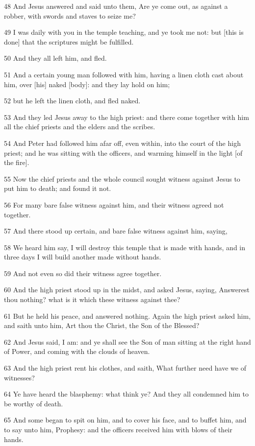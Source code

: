 \par 48 And Jesus answered and said unto them, Are ye come out, as against a robber, with swords and staves to seize me?
\par 49 I was daily with you in the temple teaching, and ye took me not: but [this is done] that the scriptures might be fulfilled.
\par 50 And they all left him, and fled.
\par 51 And a certain young man followed with him, having a linen cloth cast about him, over [his] naked [body]: and they lay hold on him;
\par 52 but he left the linen cloth, and fled naked.
\par 53 And they led Jesus away to the high priest: and there come together with him all the chief priests and the elders and the scribes.
\par 54 And Peter had followed him afar off, even within, into the court of the high priest; and he was sitting with the officers, and warming himself in the light [of the fire].
\par 55 Now the chief priests and the whole council sought witness against Jesus to put him to death; and found it not.
\par 56 For many bare false witness against him, and their witness agreed not together.
\par 57 And there stood up certain, and bare false witness against him, saying,
\par 58 We heard him say, I will destroy this temple that is made with hands, and in three days I will build another made without hands.
\par 59 And not even so did their witness agree together.
\par 60 And the high priest stood up in the midst, and asked Jesus, saying, Answerest thou nothing? what is it which these witness against thee?
\par 61 But he held his peace, and answered nothing. Again the high priest asked him, and saith unto him, Art thou the Christ, the Son of the Blessed?
\par 62 And Jesus said, I am: and ye shall see the Son of man sitting at the right hand of Power, and coming with the clouds of heaven.
\par 63 And the high priest rent his clothes, and saith, What further need have we of witnesses?
\par 64 Ye have heard the blasphemy: what think ye? And they all condemned him to be worthy of death.
\par 65 And some began to spit on him, and to cover his face, and to buffet him, and to say unto him, Prophesy: and the officers received him with blows of their hands.
